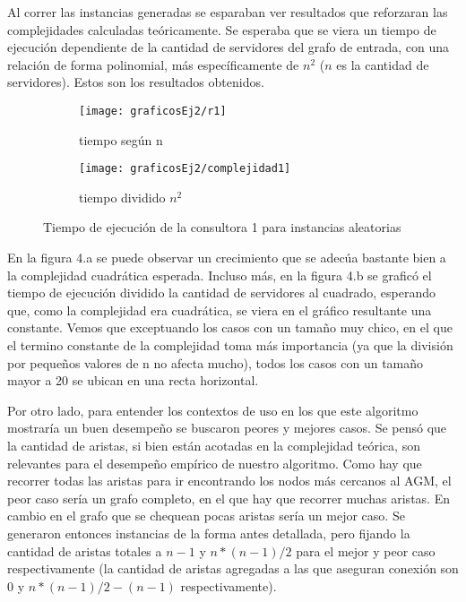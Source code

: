 \documentclass[A4paper,oneside,fleqn,11pt]{article}
\theoremstyle{definition}
\begin{document}
Al correr las instancias generadas se esparaban ver resultados que reforzaran las complejidades calculadas teóricamente. Se esperaba que se viera un tiempo de ejecución dependiente de la cantidad de servidores del grafo de entrada, con una relación de forma polinomial, más específicamente de $n^2$ ($n$ es la cantidad de servidores). Estos son los resultados obtenidos. 

\begin{figure}[H] %
    \begin{subfigure}[b]{0.45\textwidth}
        \texttt{[image: graficosEj2/r1]}
        \caption[center]{tiempo según n}
        \label{ni se pa que sirve esto}
    \end{subfigure}
    \begin{subfigure}[b]{0.45\textwidth}
        \texttt{[image: graficosEj2/complejidad1]}
        \caption{tiempo dividido $n^2$}
        \label{ni se pa que sirve esto}
    \end{subfigure}
    \caption{Tiempo de ejecución de la consultora 1 para instancias aleatorias}
\end{figure}

En la figura 4.a se puede observar un crecimiento que se adecúa bastante bien a la complejidad cuadrática esperada. Incluso más, en la figura 4.b se graficó el tiempo de ejecución dividido la cantidad de servidores al cuadrado, esperando que, como la complejidad era cuadrática, se viera en el gráfico resultante una constante. Vemos que exceptuando los casos con un tamaño muy chico, en el que el termino constante de la complejidad toma más importancia (ya que la división por pequeños valores de n no afecta mucho), todos los casos con un tamaño mayor a 20 se ubican en una recta horizontal.

Por otro lado, para entender los contextos de uso en los que este algoritmo mostraría un buen desempeño se buscaron peores y mejores casos. Se pensó que la cantidad de aristas, si bien están acotadas en la complejidad teórica, son relevantes para el desempeño empírico de nuestro algoritmo. Como hay que recorrer todas las aristas para ir encontrando los nodos más cercanos al AGM, el peor caso sería un grafo completo, en el que hay que recorrer muchas aristas. En cambio  en el grafo que se chequean pocas aristas sería un mejor caso. Se generaron entonces instancias  de la forma antes detallada, pero fijando la cantidad de aristas totales a $n-1$ y $n*(n-1)/2$ para el mejor y peor caso respectivamente (la cantidad de aristas agregadas a las que aseguran conexión son $0$ y $n*(n-1)/2 - (n-1)$ respectivamente).
\end{document}
